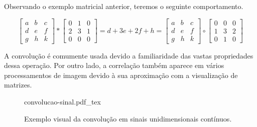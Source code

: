 Observando o exemplo matricial anterior, teremos o seguinte comportamento.

\begin{equation} \label{eq:corrconv}
    \begin{bmatrix}
        a & b & c \\
        d & e & f \\
        g & h & k
    \end{bmatrix} \ast \begin{bmatrix}
        0 & 1 & 0 \\
        2 & 3 & 1 \\
        0 & 0 & 0
    \end{bmatrix}
    = d + 3e + 2f + h =
    \begin{bmatrix}
        a & b & c \\
        d & e & f \\
        g & h & k
    \end{bmatrix} \circ \begin{bmatrix}
        0 & 0 & 0 \\
        1 & 3 & 2 \\
        0 & 1 & 0
    \end{bmatrix}
\end{equation}

A convolução é comumente usada devido a familiaridade das vastas propriedades dessa operação. Por outro lado, a correlação também aparece em vários processamentos de imagem devido à sua aproximação com a visualização de matrizes.

\begin{figure}[H]
    \centering
    \def\svgwidth{12cm}
    {convolucao-sinal.pdf_tex}

    \caption{Exemplo visual da convolução em sinais unidimensionais contínuos.}
    \label{fig:convolucao-sinal}
\end{figure}
